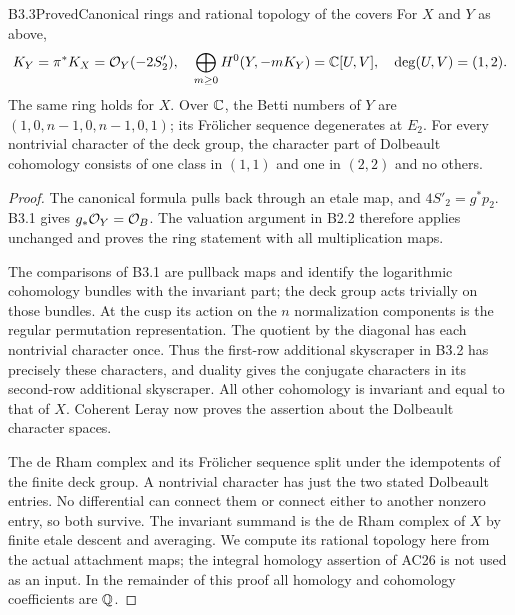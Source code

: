 \begin{claim}{B3.3}{Proved}{Canonical rings and rational topology of the covers}
For $X$ and $Y$ as above,
\[
K_Y=\pi^*K_X=\mathcal O_Y(-2S'_2),\quad
\bigoplus_{m\ge0}H^0(Y,-mK_Y)=\mathbb C[U,V],\quad
\deg(U,V)=(1,2).
\]
The same ring holds for $X$.
Over $\mathbb C$, the Betti numbers of $Y$ are
$(1,0,n-1,0,n-1,0,1)$; its Fr\"olicher sequence degenerates at $E_2$.
For every nontrivial character of the deck group, the character
part of Dolbeault cohomology consists of one class in $(1,1)$ and
one in $(2,2)$ and no others.
\end{claim}
\begin{proof}
The canonical formula pulls back through an etale map, and
$4S'_2=g^*p_2$. B3.1 gives $g_*\mathcal O_Y=\mathcal O_B$.
The valuation argument in B2.2 therefore applies unchanged and proves
the ring statement with all multiplication maps.

The comparisons of B3.1 are pullback maps and identify the logarithmic
cohomology bundles with the invariant part; the deck group acts
trivially on those bundles. At the cusp its action on the $n$
normalization components is the regular permutation representation.
The quotient by the diagonal has each nontrivial character once.
Thus the first-row additional skyscraper in B3.2 has precisely these
characters, and duality gives the conjugate characters in its
second-row additional skyscraper. All other cohomology is invariant
and equal to that of $X$. Coherent Leray now proves the assertion
about the Dolbeault character spaces.

The de Rham complex and its Fr\"olicher sequence split under the
idempotents of the finite deck group. A nontrivial character has just
the two stated Dolbeault entries. No differential can connect them
or connect either to another nonzero entry, so both survive.
The invariant summand is the de Rham complex of $X$ by finite
etale descent and averaging. We compute its rational topology here
from the actual attachment maps; the integral homology assertion
of AC26 is not used as an input. In the remainder of this proof
all homology and cohomology coefficients are $\mathbb Q$.


\end{proof}
